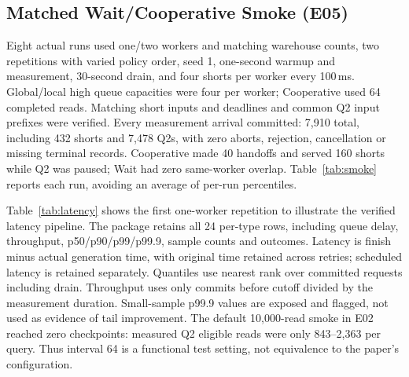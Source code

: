 \documentclass[sigconf,nonacm]{acmart}
\begin{document}
\subsection{Matched Wait/Cooperative Smoke (E05)}
Eight actual runs used one/two workers and matching warehouse counts, two
repetitions with varied policy order, seed 1, one-second warmup and measurement,
30-second drain, and four shorts per worker every 100\,ms. Global/local high
queue capacities were four per worker; Cooperative used 64 completed reads.
Matching short inputs and deadlines and common Q2 input prefixes were verified.
Every measurement arrival committed: 7,910 total, including 432 shorts and
7,478 Q2s, with zero aborts, rejection, cancellation or missing terminal records.
Cooperative made 40 handoffs and served 160 shorts while Q2 was paused; Wait
had zero same-worker overlap. Table~\ref{tab:smoke} reports each run, avoiding
an average of per-run percentiles.

\begin{table}[t]
\caption{E05 measurement cohorts, including drain commits. W/R denotes workers/repetition.
Window counts commits before cutoff; handoffs are mid-Q2. These are functional smoke
counts, not native throughput comparisons.}
\label{tab:smoke}
\centering\small
\end{table}

Table~\ref{tab:latency} shows the first one-worker repetition to illustrate
the verified latency pipeline. The package retains all 24 per-type rows,
including queue delay, throughput, p50/p90/p99/p99.9, sample counts and outcomes.
Latency is finish minus actual generation time, with original time retained
across retries; scheduled latency is retained separately. Quantiles use nearest
rank over committed requests including drain. Throughput uses only commits
before cutoff divided by the measurement duration. Small-sample p99.9 values
are exposed and flagged, not used as evidence of tail improvement.
The default 10,000-read smoke in E02 reached zero checkpoints: measured Q2
eligible reads were only 843--2,363 per query. Thus interval 64 is a functional
test setting, not equivalence to the paper's configuration.

\begin{table}[t]
\caption{E05 one worker, repetition 1, end-to-end latency in microseconds.
All p99.9 entries (*) have fewer than 1,000 observations and are low-sample
diagnostics. No native performance conclusion is drawn.}
\label{tab:latency}
\centering\small
\end{table}
\end{document}
